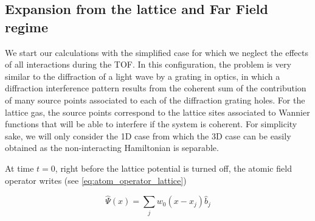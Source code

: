 



\subsection{Expansion from the lattice and Far Field regime}

We start our calculations with the simplified case for which we neglect the effects of all interactions during the TOF. In this configuration, the problem is very similar to the diffraction of a light wave by a grating in optics, in which a diffraction interference pattern results from the coherent sum of the contribution of many source points associated to each of the diffraction grating holes. For the lattice gas, the source points correspond to the lattice sites associated to Wannier functions that will be able to interfere if the system is coherent. For simplicity sake, we will only consider the 1D case from which the 3D case can be easily obtained as the non-interacting Hamiltonian is separable.

At time $t=0$, right before the lattice potential is turned off, the atomic field operator writes (see \ref{eq:atom_operator_lattice})

\begin{equation}
    \hat{\Psi}(x)= \sum_{j} w_{0}(x-x_j) \hat{b}_{j} 
    \label{eq:field_operator}
\end{equation}



